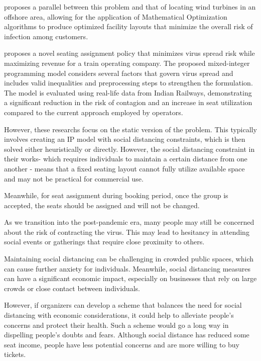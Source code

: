 \cite{fischetti2021safe} proposes a parallel between this problem and that of locating wind turbines in an offshore area, allowing for the application of Mathematical Optimization algorithms to produce optimized facility layouts that minimize the overall risk of infection among customers. 

\cite{haque2023social} proposes a novel seating assignment policy that minimizes virus spread risk while maximizing revenue for a train operating company. The proposed mixed-integer programming model considers several factors that govern virus spread and includes valid inequalities and preprocessing steps to strengthen the formulation. The model is evaluated using real-life data from Indian Railways, demonstrating a significant reduction in the risk of contagion and an increase in seat utilization compared to the current approach employed by operators.

However, these researchs focus on the static version of the problem. This typically involves creating an IP model with social distancing constraints, which is then solved either heuristically or directly. However, the social distancing constraint in their works- which requires individuals to maintain a certain distance from one another - means that a fixed seating layout cannot fully utilize available space and may not be practical for commercial use.

Meanwhile, for seat assignment during booking period, once the group is accepted, the seats should be assigned and will not be changed. 


As we transition into the post-pandemic era, many people may still be concerned about the risk of contracting the virus. This may lead to hesitancy in attending social events or gatherings that require close proximity to others.

Maintaining social distancing can be challenging in crowded public spaces, which can cause further anxiety for individuals. Meanwhile, social distancing measures can have a significant economic impact, especially on businesses that rely on large crowds or close contact between individuals.

However, if organizers can develop a scheme that balances the need for social distancing with economic considerations, it could help to alleviate people's concerns and protect their health. Such a scheme would go a long way in dispelling people's doubts and fears. Although social distance has reduced some seat income, people have less potential concerns and are more willing to buy tickets.



